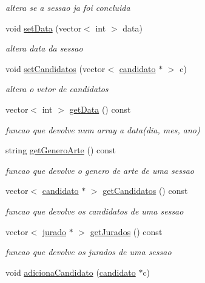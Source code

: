 \begin{DoxyCompactItemize}
\begin{DoxyCompactList}\small\item\em altera se a sessao ja foi concluida \end{DoxyCompactList}\item 
void \hyperlink{classsessao_a7c9a1eaba24458e7b70053cc0d9f6dc4}{set\+Data} (vector$<$ int $>$ data)
\begin{DoxyCompactList}\small\item\em altera data da sessao \end{DoxyCompactList}\item 
void \hyperlink{classsessao_a1802bcff6720bf14b6387ef9d7943f6c}{set\+Candidatos} (vector$<$ \hyperlink{classcandidato}{candidato} $\ast$ $>$ c)
\begin{DoxyCompactList}\small\item\em altera o vetor de candidatos \end{DoxyCompactList}\item 
vector$<$ int $>$ \hyperlink{classsessao_aa9da748eb3886e40295893379ac500fd}{get\+Data} () const 
\begin{DoxyCompactList}\small\item\em funcao que devolve num array a data(dia, mes, ano) \end{DoxyCompactList}\item 
string \hyperlink{classsessao_a31a5d1fe361cab689d81f4fd96baae91}{get\+Genero\+Arte} () const 
\begin{DoxyCompactList}\small\item\em funcao que devolve o genero de arte de uma sessao \end{DoxyCompactList}\item 
vector$<$ \hyperlink{classcandidato}{candidato} $\ast$ $>$ \hyperlink{classsessao_aaeb774f071377658f957f909d29bf0c8}{get\+Candidatos} () const 
\begin{DoxyCompactList}\small\item\em funcao que devolve os candidatos de uma sessao \end{DoxyCompactList}\item 
vector$<$ \hyperlink{classjurado}{jurado} $\ast$ $>$ \hyperlink{classsessao_a6e384ba6e74b654bee58ccff5ed241fe}{get\+Jurados} () const 
\begin{DoxyCompactList}\small\item\em funcao que devolve os jurados de uma sessao \end{DoxyCompactList}\item 
void \hyperlink{classsessao_a48c51d6f1f2f8c948a0a227336de1d12}{adiciona\+Candidato} (\hyperlink{classcandidato}{candidato} $\ast$c)

\end{DoxyCompactItemize}
